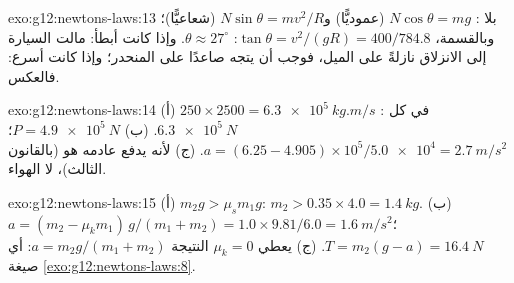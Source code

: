 \begin{solution}{exo:g12:newtons-laws:13}
بلا : $N\cos\theta = mg$ (عموديًّا) و$N\sin\theta =
mv^2/R$ (شعاعيًّا)؛ وبالقسمة، $\tan\theta = v^2/(gR) = 400/784.8$:
$\theta \approx 27^\circ$. وإذا كانت أبطأ: مالت السيارة إلى الانزلاق نازلةً على
الميل، فوجب أن يتجه  صاعدًا على المنحدر؛ وإذا كانت أسرع: فالعكس.
\end{solution}

\begin{solution}{exo:g12:newtons-laws:14}
(أ) $250 \times 2500 = \qty{6.3e5}{kg.m/s}$ في كل : 
$\qty{6.3e5}{N}$. (ب) $P = \qty{4.9e5}{N}$؛
$a = (6.25 - 4.905) \times 10^5 / \num{5.0e4} = \qty{2.7}{m/s^2}$.
(ج) لأنه يدفع عادمه هو (بالقانون الثالث)، لا الهواء.
\end{solution}

\begin{solution}{exo:g12:newtons-laws:15}
(أ) $m_2 g > \mu_s m_1 g$: $m_2 > 0.35 \times 4.0 = \qty{1.4}{kg}$.
(ب) $a = (m_2 - \mu_k m_1)\,g/(m_1 + m_2) = 1.0 \times 9.81/6.0 =
\qty{1.6}{m/s^2}$؛ $T = m_2(g - a) = \qty{16.4}{N}$.
(ج) يعطي $\mu_k = 0$ النتيجة $a = m_2 g/(m_1 + m_2)$: أي صيغة
\cref{exo:g12:newtons-laws:8}.
\end{solution}

